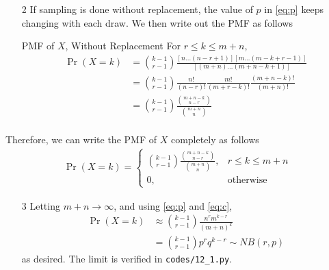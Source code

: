 \documentclass{beamer}
\providecommand{\pr}[1]{\ensuremath{\Pr\left(#1\right)}}
\begin{document}
\begin{frame}
	\begin{enumerate}
		\item[2] If sampling is done without replacement, the value of $p$ in \eqref{eq:p} keeps changing with each draw. We then write out the PMF as follows
			\begin{alertblock}{PMF of $X$, Without Replacement}
        		For $r \leq k \leq m + n$,
				\begin{align}
					\pr{X = k} &= \binom{k - 1}{r - 1}\frac{[n\ldots(n - r + 1)][m\ldots(m - k + r - 1)]}{[(m + n)\ldots(m + n - k + 1)]} \label{eq:c}\\
					&= \binom{k - 1}{r - 1}\frac{n!}{(n - r)!}\frac{m!}{(m + r - k)!}\frac{(m + n - k)!}{(m + n)!} \\
					&= \binom{k - 1}{r - 1}\frac{\binom{m + n - k}{n - r}}{\binom{m + n}{n}} \\
					\label{eq:pmf_norep}
		        \end{align}
    		\end{alertblock}
	\end{enumerate}
\end{frame}

\begin{frame}
	Therefore, we can write the PMF of $X$ completely as follows
	\begin{align}
		\pr{X = k} =
		\begin{cases}
			\binom{k - 1}{r - 1}\frac{\binom{m + n - k}{n - r}}{\binom{m + n}{n}}, & r \leq k \leq m + n \\
			0, & \textrm{otherwise}
		\end{cases}
		\label{eq:full-pmf}
	\end{align}
	\begin{enumerate}
		\item[3] Letting $m + n \to \infty$, and using \eqref{eq:p} and \eqref{eq:c},
			\begin{align}
				\pr{X = k} &\approx \binom{k - 1}{r - 1}\frac{n^rm^{k - r}}{(m + n)^k} \\
				&= \binom{k - 1}{r - 1}p^rq^{k - r} \sim NB(r, p)
				\label{eq:lim}
			\end{align}
			as desired. The limit is verified in \texttt{codes/12{\_}1.py}.
	\end{enumerate}
\end{frame}
\end{document}
